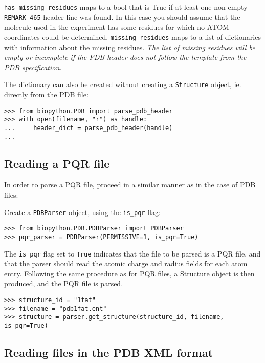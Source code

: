\verb+has_missing_residues+ maps to a bool that is True if at least
one non-empty \verb+REMARK 465+ header line was found. In this case
you should assume that the molecule used in the experiment has some 
residues for which no ATOM coordinates could be determined. 
\verb+missing_residues+ maps to a list of dictionaries with information
about the missing residues. \emph{The list of missing residues will be
empty or incomplete if the PDB header does not follow the template from
the PDB specification.}

The dictionary can also be created without creating a \texttt{Structure}
object, ie. directly from the PDB file:

\begin{verbatim}
>>> from biopython.PDB import parse_pdb_header
>>> with open(filename, "r") as handle:
...     header_dict = parse_pdb_header(handle)
...
\end{verbatim}

\subsection{Reading a PQR file}

In order to parse a PQR file, proceed in a similar manner as in the case
of PDB files:

Create a \texttt{PDBParser} object, using the \texttt{is\_pqr} flag:

\begin{verbatim}
>>> from biopython.PDB.PDBParser import PDBParser
>>> pqr_parser = PDBParser(PERMISSIVE=1, is_pqr=True)
\end{verbatim}

The \texttt{is\_pqr} flag set to \texttt{True} indicates that the file to be parsed is a PQR file, 
and that the parser should read the atomic charge and radius fields for each atom entry. Following the same procedure as for PQR files, a Structure object is then produced, and the PQR file is parsed.

\begin{verbatim}
>>> structure_id = "1fat"
>>> filename = "pdb1fat.ent"
>>> structure = parser.get_structure(structure_id, filename, is_pqr=True)
\end{verbatim}

\subsection{Reading files in the PDB XML format}


